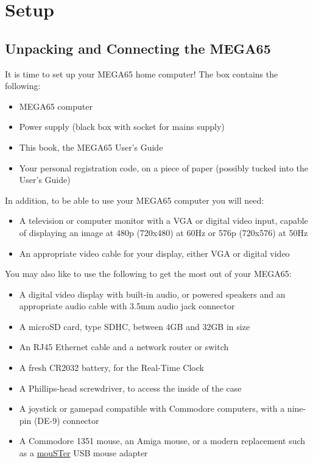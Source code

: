 \chapter{Setup}

\section{Unpacking and Connecting the MEGA65}
\label{cha:setup}

It is time to set up your MEGA65 home computer! The box contains the following:

\begin{itemize}
\setlength\itemsep{-0.75mm}
\item MEGA65 computer
\item Power supply (black box with socket for mains supply)
\item This book, the MEGA65 User's Guide
\item Your personal registration code, on a piece of paper (possibly tucked into the User's Guide)
\end{itemize}

In addition, to be able to use your MEGA65 computer you will need:

\begin{itemize}
\item A television or computer monitor with a VGA or digital video input, capable of displaying an image at 480p (720x480) at 60Hz or 576p (720x576) at 50Hz
\item An appropriate video cable for your display, either VGA or digital video
\end{itemize}

You may also like to use the following to get the most out of your MEGA65:

\begin{itemize}
\item A digital video display with built-in audio, or powered speakers and an appropriate audio cable with 3.5mm audio jack connector
\item A microSD card, type SDHC, between 4GB and 32GB in size
\item An RJ45 Ethernet cable and a network router or switch
\item A fresh CR2032 battery, for the Real-Time Clock
\item A Phillips-head screwdriver, to access the inside of the case
\item A joystick or gamepad compatible with Commodore computers, with a nine-pin (DE-9) connector
\item A Commodore 1351 mouse, an Amiga mouse, or a modern replacement such as a \href{https://retrohax.net/shop/amiga/mouster/}{mouSTer} USB mouse adapter
\end{itemize}


